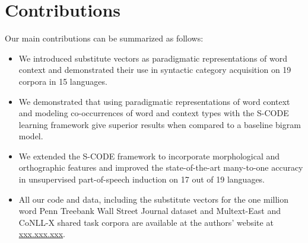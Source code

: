 \section{Contributions}
\label{sec:contrib}

Our main contributions can be summarized as follows:
\begin{itemize}
\item We introduced substitute vectors as paradigmatic representations
  of word context and demonstrated their use in syntactic category
  acquisition on 19 corpora in 15 languages.
\item We demonstrated that using paradigmatic representations of word
  context and modeling co-occurrences of word and context types with
  the S-CODE learning framework give superior results when compared to
  a baseline bigram model.
\item We extended the S-CODE framework to incorporate morphological
  and orthographic features and improved the state-of-the-art
  many-to-one accuracy in unsupervised part-of-speech induction on 17
  out of 19 languages.
\item All our code and data, including the substitute vectors for the
  one million word Penn Treebank Wall Street Journal dataset and
  Multext-East and CoNLL-X shared task corpora are available at the
  authors' website at \mbox{\url{xxx.xxx.xxx}}.
\end{itemize}

